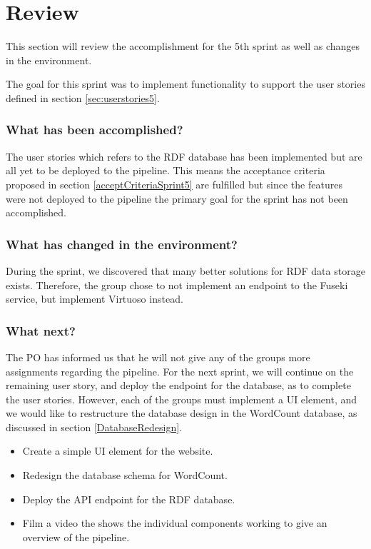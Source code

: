 \section{Review}
This section will review the accomplishment for the 5th sprint as well as changes in the \knox{} environment. 

The goal for this sprint was to implement functionality to support the user stories defined in section \ref{sec:userstories5}. 

\subsubsection*{What has been accomplished?}
The user stories which refers to the RDF database has been implemented but are all yet to be deployed to the \knox{} pipeline. This means the acceptance criteria proposed in section \ref{acceptCriteriaSprint5} are fulfilled but since the features were not deployed to the pipeline the primary goal for the sprint has not been accomplished. 

\subsubsection*{What has changed in the environment?}
During the sprint, we discovered that many better solutions for RDF data storage exists. Therefore, the group chose to not implement an endpoint to the Fuseki service, but implement Virtuoso instead. 

\subsubsection*{What next?}
The PO has informed us that he will not give any of the \knox{} groups more assignments regarding the pipeline. 
For the next sprint, we will continue on the remaining user story, and deploy the endpoint for the database, as to complete the user stories. 
However, each of the \knox{} groups must implement a UI element, and we would like to restructure the database design in the WordCount database, as discussed in section \ref{DatabaseRedesign}.

\begin{itemize}
    \item Create a simple UI element for the \knox{} website.
    \item Redesign the database schema for WordCount.
    \item Deploy the API endpoint for the RDF database.
    \item Film a video the shows the individual components working to give an overview of the pipeline.
\end{itemize}

